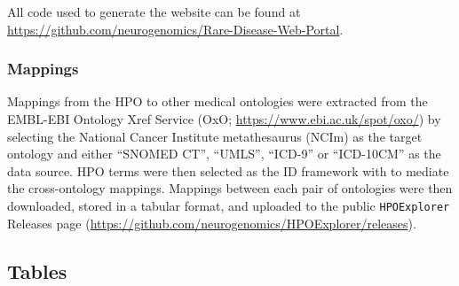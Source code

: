 \documentclass[
]{article}
\begin{document}
All code used to generate the website can be found at
\url{https://github.com/neurogenomics/Rare-Disease-Web-Portal}.

\subsubsection{Mappings}\label{mappings-1}

Mappings from the HPO to other medical ontologies were extracted from
the EMBL-EBI Ontology Xref Service (OxO;
\url{https://www.ebi.ac.uk/spot/oxo/}) by selecting the National Cancer
Institute metathesaurus (NCIm) as the target ontology and either
``SNOMED CT'', ``UMLS'', ``ICD-9'' or ``ICD-10CM'' as the data source.
HPO terms were then selected as the ID framework with to mediate the
cross-ontology mappings. Mappings between each pair of ontologies were
then downloaded, stored in a tabular format, and uploaded to the public
\texttt{HPOExplorer} Releases page
(\url{https://github.com/neurogenomics/HPOExplorer/releases}).

\newpage{}

\subsection{Tables}\label{tables}

\begin{table}

\caption{\label{tbl-mappings}Mappings between HPO phenotypes and other
medical ontologies. ``source'' indicates the medical ontology and
``distance'' indicates the cross-ontology distance. ``source terms'' and
``HPO terms'' indicates the number of unique IDs mapped from the source
ontology and HPO respectively. ``mappings'' is the total number of
cross-ontology mappings within a given distance. Some IDs may have more
than one mapping for a given source due to many-to-many relationships.}


\end{table}%
\end{document}
